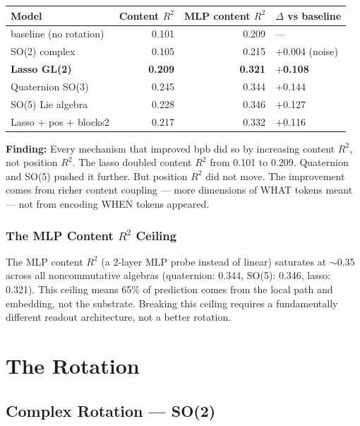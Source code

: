 \documentclass[11pt,a4paper]{report}
\newcommand{\finding}[1]{\textcolor{finding}{\textbf{Finding:}} #1}
\begin{document}
\begin{center}
\begin{tabular}{lrrl}
\toprule
Model & Content $R^2$ & MLP content $R^2$ & $\Delta$ vs baseline \\
\midrule
baseline (no rotation) & 0.101 & 0.209 & --- \\
SO(2) complex & 0.105 & 0.215 & $+$0.004 (noise) \\
\textbf{Lasso GL(2)} & \textbf{0.209} & \textbf{0.321} & $+$\textbf{0.108} \\
Quaternion SO(3) & 0.245 & 0.344 & $+$0.144 \\
SO(5) Lie algebra & 0.228 & 0.346 & $+$0.127 \\
Lasso + pos + blocks2 & 0.217 & 0.332 & $+$0.116 \\
\bottomrule
\end{tabular}
\end{center}

\finding{Every mechanism that improved bpb did so by increasing content $R^2$, not position $R^2$.} The lasso doubled content $R^2$ from 0.101 to 0.209. Quaternion and SO(5) pushed it further. But position $R^2$ did not move. The improvement comes from richer content coupling --- more dimensions of WHAT tokens meant --- not from encoding WHEN tokens appeared.

\section{The MLP Content $R^2$ Ceiling}

The MLP content $R^2$ (a 2-layer MLP probe instead of linear) saturates at $\sim$0.35 across all noncommutative algebras (quaternion: 0.344, SO(5): 0.346, lasso: 0.321). This ceiling means 65\% of prediction comes from the local path and embedding, not the substrate. Breaking this ceiling requires a fundamentally different readout architecture, not a better rotation.


\part{The Rotation}
\label{part:rotation}

\chapter{Complex Rotation --- SO(2)}
\end{document}
